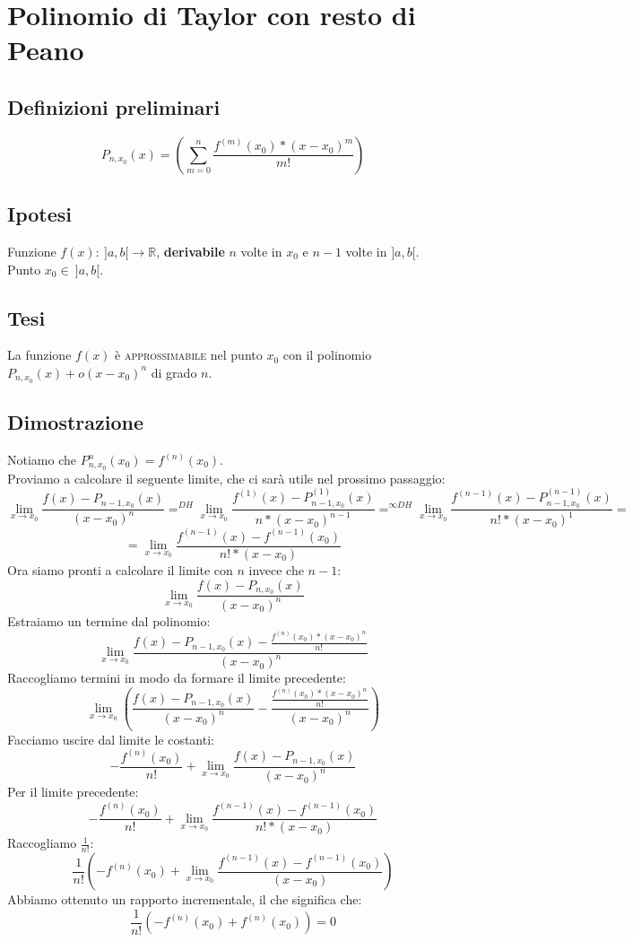 \documentclass{article}
\begin{document}
\newpage

\section{Polinomio di Taylor con resto di Peano}

\subsection{Definizioni preliminari}
\[P_{n, x_0}(x) = (\sum^{n}_{m = 0} \frac{f^{(m)}(x_0) * (x - x_0)^m}{m!})\]

\begin{multicols}{2}
    \subsection{Ipotesi}
    Funzione \(f(x) :\ ]a, b[ \to \mathbb{R}\), \textbf{derivabile} \(n\) volte in \(x_0\) e \(n - 1\) volte in \(]a, b[\).\\
    Punto \(x_0 \in\ ]a, b[\).
\columnbreak
    \subsection{Tesi}
    La funzione \(f(x)\) è \textsc{approssimabile} nel punto \(x_0\) con il polinomio \(P_{n, x_0}(x) + o(x - x_0)^n\) di grado \(n\).
\end{multicols}

\subsection{Dimostrazione}

Notiamo che \(P^{n}_{n, x_0}(x_0) = f^{(n)}(x_0)\).\\
Proviamo a calcolare il seguente limite, che ci sarà utile nel prossimo passaggio:
\[\lim_{x \to x_0} \frac{f(x) - P_{n - 1, x_0}(x)}{(x - x_0)^n} =^{DH} \lim_{x \to x_0} \frac{f^{(1)}(x) - P^{(1)}_{n - 1, x_0}(x)}{n * (x - x_0)^{n - 1}} =^{\infty DH} \lim_{x \to x_0} \frac{f^{(n - 1)}(x) - P^{(n - 1)}_{n - 1, x_0}(x)}{n! * (x - x_0)^{1}} =\]
\[= \lim_{x \to x_0} \frac{f^{(n - 1)}(x) - f^{(n - 1)}(x_0)}{n! * (x - x_0)}\]
Ora siamo pronti a calcolare il limite con \(n\) invece che \(n - 1\):
\[\lim_{x \to x_0} \frac{f(x) - P_{n, x_0}(x)}{(x - x_0)^n}\]
Estraiamo un termine dal polinomio:
\[\lim_{x \to x_0} \frac{f(x) - P_{n - 1, x_0}(x) - \frac{f^{(n)}(x_0) * (x - x_0)^n}{n!}}{(x - x_0)^n}\]
Raccogliamo termini in modo da formare il limite precedente:
\[\lim_{x \to x_0} ( \frac{f(x) - P_{n - 1, x_0}(x)}{(x - x_0)^n} - \frac{\frac{f^{(n)}(x_0) * (x - x_0)^n}{n!}}{(x - x_0)^n} ) \]
Facciamo uscire dal limite le costanti:
\[- \frac{f^{(n)}(x_0)}{n!} + \lim_{x \to x_0} \frac{f(x) - P_{n - 1, x_0}(x)}{(x - x_0)^n}\]
Per il limite precedente:
\[- \frac{f^{(n)}(x_0)}{n!} + \lim_{x \to x_0} \frac{f^{(n - 1)}(x) - f^{(n - 1)}(x_0)}{n! * (x - x_0)}\]
Raccogliamo \(\frac{1}{n!}\):
\[\frac{1}{n!} (- f^{(n)}(x_0) + \lim_{x \to x_0} \frac{f^{(n - 1)}(x) - f^{(n - 1)}(x_0)}{(x - x_0)})\]
Abbiamo ottenuto un rapporto incrementale, il che significa che:
\[\frac{1}{n!} (- f^{(n)}(x_0) + f^{(n)}(x_0)) = 0\]
\end{document}
